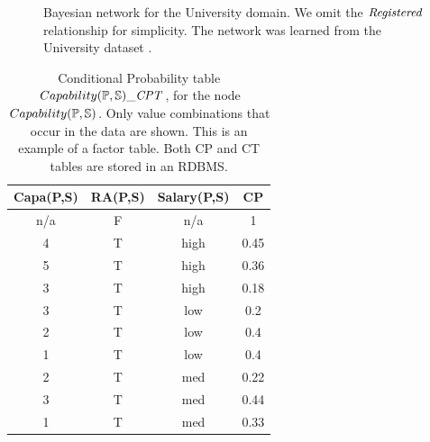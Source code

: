 \begin{figure}[htbp] %
 \centering
{} 
\caption{Bayesian network for the University domain. 
We omit the $\it{Registered}$ relationship for simplicity. 
The network was learned from the University dataset \cite{bib:bbsite}.}
 \label{fig:pbn}
\end{figure}

\begin{table}[htbp]
  \centering
  \caption{ Conditional Probability table $Capability(\P,\S)\_\cptable$, for the node $Capability(\P,\S)$. Only value combinations that occur in the data are shown. This is an example of a factor table.  Both CP and CT tables are stored in an RDBMS.}
    \begin{tabular}{|c|c|c|c|} \hline
    \textbf{Capa(P,S)} & \textbf{RA(P,S)} & \textbf{Salary(P,S)} & \textbf{CP} \\ \hline
    n/a   & F     & n/a   & 1 \\ \hline
    4     & T     & high  & 0.45 \\ \hline
    5     & T     & high  & 0.36 \\ \hline
    3     & T     & high  & 0.18 \\ \hline
    3     & T     & low   & 0.2 \\ \hline
    2     & T     & low   & 0.4 \\ \hline
    1     & T     & low   & 0.4 \\ \hline
    2     & T     & med   & 0.22 \\ \hline
    3     & T     & med   & 0.44 \\ \hline
    1     & T     & med   & 0.33 \\ \hline
    \end{tabular}%
  \label{tab:pbn-cp}%
\end{table}%

